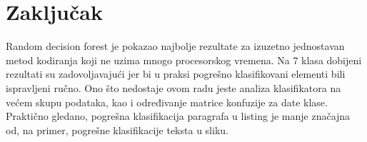 \documentclass[]{amsart}
\begin{document}
\section{Zaključak}
\label{sec:orge359279}

Random decision forest je pokazao najbolje rezultate za izuzetno jednostavan metod kodiranja koji ne uzima mnogo procesorskog vremena. Na 7 klasa dobijeni
rezultati su zadovoljavajući jer bi u praksi pogrešno klasifikovani elementi bili ispravljeni ručno. Ono što nedostaje ovom radu jeste
analiza klasifikatora na većem skupu podataka, kao i određivanje matrice konfuzije za date klase. Praktično gledano, pogrešna klasifikacija paragrafa u listing je manje
značajna od, na primer, pogrešne klasifikacije teksta u sliku.





\end{document}
